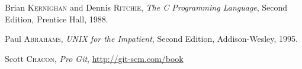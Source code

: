 \begin{thebibliography}{10}

Brian \textsc{Kernighan} and Dennis \textsc{Ritchie},
\emph{The C Programming Language},
Second Edition, Prentice Hall, 1988.

\medskip
{}
Paul \textsc{Abrahams},
\emph{UNIX for the Impatient},
Second Edition, Addison-Wesley, 1995.

\medskip
{}
Scott \textsc{Chacon},
\emph{Pro Git},
\url{http://git-scm.com/book}

\end{thebibliography}
